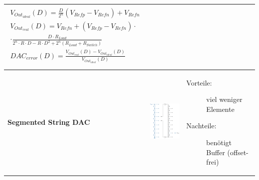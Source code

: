 \begin{longtable}{|>{\bfseries}p{3cm}|c|p{7.6cm}|}
	  {\begin{align*}
	  	V_{Out_{ideal}}(D) = \frac{D}{2^n}(V_{Refp}-V_{Refn})+V_{Refn}\\
	  	V_{Out_{real}}(D) = V_{Refn}+\left(V_{Refp}-V_{Refn}\right)\cdot\\
	  		\cdot\frac{D \cdot R_{Load}}{2^n \cdot R \cdot D-R \cdot D^2 + 2^n (R_{Load} + R_{Switch}) }\\
	  	DAC_{error}(D)=\frac{V_{Out_{real}}(D)-V_{Out_{ideal}}(D)}{V_{Out_{ideal}}(D)}\\
	  \end{align*}}
	  
	\\ \hline
	Segmented String DAC \hartl{459}
	& \includegraphics[width=5cm, height = 3cm, valign=t]{pictures/segmented_string_DAC}
	& \begin{description}
  		\item[Vorteile: ] viel weniger Elemente
  		\item[Nachteile:] benötigt Buffer (offset-frei)
	  \end{description}
	\\ \hline
\end{longtable}
\renewcommand{\arraystretch}{\arraystretchOriginal}





